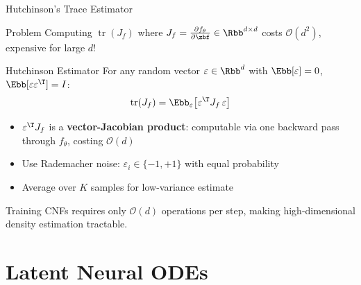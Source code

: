 \documentclass[aspectratio=169,xcolor=dvipsnames,svgnames,x11names,fleqn]{beamer}
\begin{document}
 
 \begin{frame}{Hutchinson's Trace Estimator}
 \scriptsize
 
\begin{block}{Problem}
Computing $\operatorname{tr}(J_f)$ where $J_f = \frac{\partial f_\theta}{\partial \zbf} \in \Rbb^{d \times d}$ costs $\mathcal{O}(d^2)$, expensive for large $d$!
\end{block}
\vspace{6pt}
\begin{tblockFrost}{Hutchinson Estimator}
For any random vector $\varepsilon \in \Rbb^d$ with $\Ebb[\varepsilon] = 0$, $\Ebb[\varepsilon \varepsilon^\T] = I$:
$$
  \operatorname{tr}(J_f) = \Ebb_{\varepsilon}\!\left[\varepsilon^\T J_f\, \varepsilon\right]
$$
\begin{itemize}
  \item $\varepsilon^\T J_f$ is a \textbf{vector-Jacobian product}: computable via one backward pass through $f_\theta$, costing $\mathcal{O}(d)$
  \item Use Rademacher noise: $\varepsilon_i \in \{-1, +1\}$ with equal probability
  \item Average over $K$ samples for low-variance estimate
\end{itemize}
\end{tblockFrost}
\begin{alertblock}{}
Training CNFs requires only $\mathcal{O}(d)$ operations per step, making high-dimensional density estimation tractable.
\end{alertblock}
\end{frame}

\section{Latent Neural ODEs}
 
\end{document}
